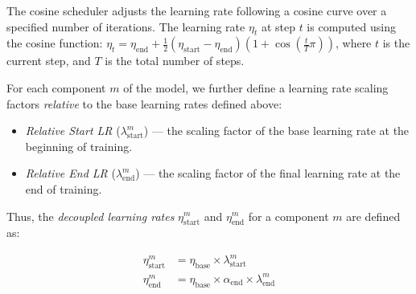 \documentclass{article} %
\newcommand{\jmr}[2]{\textcolor{purple}{[JM:] \sout{#1} #2}}
\begin{document}
    The cosine scheduler adjusts the learning rate following a cosine curve over a specified number of iterations.  The learning rate $\eta_t$ at step $t$ is computed using the cosine function: $\eta_t = \eta_{\text{end}} + \frac{1}{2} (\eta_{\text{start}} - \eta_{\text{end}}) \left(1 + \cos\left(\frac{t}{T} \pi\right)\right)$, where $t$ is the current step, and $T$ is the total number of steps.


    For each component $m$ of the model, we further define a learning rate scaling factors \textit{relative} to the base learning rates defined above:

    \begin{itemize} [topsep=0pt, leftmargin=*]
    \item \textit{Relative Start LR} ($\lambda_{\text{start}}^m$) --- the scaling factor of the base learning rate at the beginning of training. 

    \item \textit{Relative End LR} ($\lambda_{\text{end}}^m$) --- the scaling factor of the final learning rate at the end of training. 
    \end{itemize}

    Thus, the \textit{decoupled learning rates} $\eta_{\text{start}}^m$ and $\eta_{\text{end}}^m$ for a component $m$ are defined as:



    \begin{align}
    \eta_{\text{start}}^m &= \eta_{\text{base}} \times \lambda_{\text{start}}^m \\
    \eta_{\text{end}}^m &= \eta_{\text{base}} \times \alpha_{\text{end}} \times \lambda_{\text{end}}^m
    \end{align}
\end{document}
